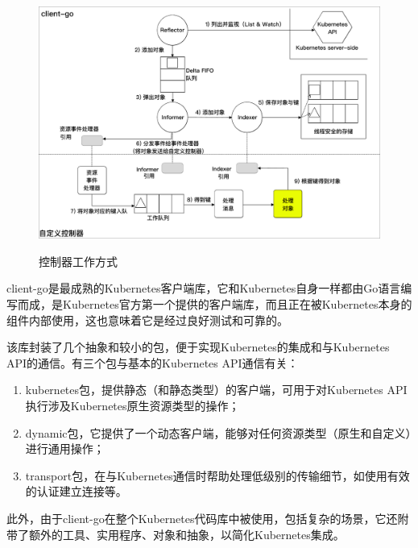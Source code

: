 \documentclass[macfonts,master]{njuthesis}
\begin{document}
\begin{figure}[htbp]
  \centering
  \includegraphics[width= 1\textwidth]{pics/client-go-controller-interaction.pdf}\\
  \caption{控制器工作方式}\label{fig:client-go-controller-interaction}
\end{figure}

client-go是最成熟的Kubernetes客户端库，它和Kubernetes自身一样都由Go语言编写而成，是Kubernetes官方第一个提供的客户端库，而且正在被Kubernetes本身的组件内部使用，这也意味着它是经过良好测试和可靠的\cite{controllerclientgo}。

该库封装了几个抽象和较小的包，便于实现Kubernetes的集成和与Kubernetes API的通信。有三个包与基本的Kubernetes API通信有关\cite{controllerclientgo}：

\begin{enumerate}
	\item kubernetes包，提供静态（和静态类型）的客户端，可用于对Kubernetes API执行涉及Kubernetes原生资源类型的操作；
	\item dynamic包，它提供了一个动态客户端，能够对任何资源类型（原生和自定义）进行通用操作；
	\item transport包，在与Kubernetes通信时帮助处理低级别的传输细节，如使用有效的认证建立连接等。
\end{enumerate}

此外，由于client-go在整个Kubernetes代码库中被使用，包括复杂的场景，它还附带了额外的工具、实用程序、对象和抽象，以简化Kubernetes集成。
\end{document}
